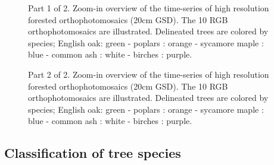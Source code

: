 \documentclass[remotesensing,article,submit,moreauthors,pdftex,12pt,a4paper]{mdpi} %
\begin{document}
\begin{figure}[H]
\centering
\captionsetup[subfigure]{labelformat=empty,singlelinecheck=true,margin=0pt, parskip=0pt,
hangindent=0pt, indention=0pt}
\hspace{5mm}
\hspace{0.05mm}
\hspace{5mm}
\hspace{0.05mm}
\hspace{5mm}
\hspace{0.05mm}
\caption{ Part 1 of 2. Zoom-in overview of the time-series of high resolution forested orthophotomosaics (20cm GSD). The 10 RGB orthophotomosaics are illustrated. Delineated trees are colored by species; English oak: green - poplars : orange - sycamore maple : blue - common ash : white - birches : purple.}
\label{fig:TS_zoomin}
\end{figure}

\begin{figure}[H]
\centering
\captionsetup[subfigure]{labelformat=empty,singlelinecheck=true,margin=0pt, parskip=0pt,
hangindent=0pt, indention=0pt}
\ContinuedFloat 
{}\hspace{5mm}
\hspace{0.05mm}
\hspace{5mm}
\hspace{0.05mm}
\caption{Part 2 of 2. Zoom-in overview of the time-series of high resolution forested orthophotomosaics (20cm GSD). The 10 RGB orthophotomosaics are illustrated. Delineated trees are colored by species; English oak: green - poplars : orange - sycamore maple : blue - common ash : white - birches : purple.}
\label{fig:TS_zoomin}
\end{figure}

\subsection{Classification of tree species}
\end{document}
